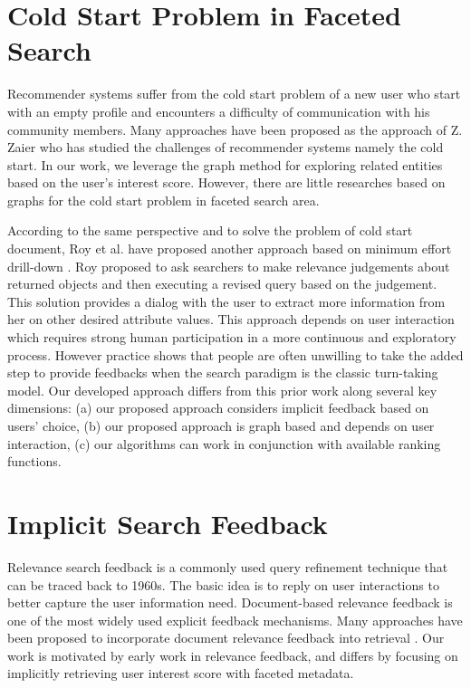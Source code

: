 \section{Cold Start Problem in Faceted Search}

Recommender systems suffer from the cold start problem of a new user who start with an empty profile and encounters a difficulty of communication with his community members. Many approaches have been proposed \cite{Leung2007, Gao2002} as the approach of Z. Zaier\cite{Zaier2010} who has studied the challenges of recommender systems namely the cold start. In our work, we leverage the graph method for exploring related entities based on the user's interest score. However, there are little researches based on graphs for the cold start problem in faceted search area. 

According to the same perspective and to solve the problem of cold start document, Roy et al. have proposed another approach based on minimum effort drill-down \cite{Roy2008}. Roy proposed to ask searchers to make relevance judgements about returned objects and then executing a revised query based on the judgement. This solution provides a dialog with the user to extract more information from her on other desired attribute values. This approach depends on user interaction which requires strong human participation in a more continuous and exploratory process. However practice shows that people are often unwilling to take the added step to provide feedbacks when the search paradigm is the classic turn-taking model. Our developed approach differs from this prior work along several key dimensions: (a) our proposed approach considers implicit feedback based on users' choice, (b) our proposed approach is graph based and depends on user interaction, (c) our algorithms can work in conjunction with available ranking functions.

\section{Implicit Search Feedback}

Relevance search feedback is a commonly used query refinement technique that can be traced back to 1960s. The basic idea is to reply on user interactions to better capture the user information need. Document-based relevance feedback is one of the most widely used explicit feedback mechanisms. Many approaches have been proposed to incorporate document relevance feedback into retrieval \cite{Zhai2001, Zhang2004}. Our work is motivated by early work in relevance feedback, and differs by focusing on implicitly retrieving user interest score with faceted metadata.


